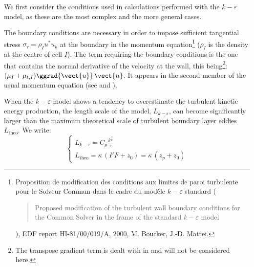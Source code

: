 We first consider the conditions used in calculations performed with the
$k-\varepsilon$ model, as these are the most complex and the more general cases.

The boundary conditions are necessary in order to impose sufficient tangential
stress $\sigma_\tau=\rho_Iu^*u_k$ at the boundary in the momentum
equation\footnote{Proposition de modification des conditions aux limites de
paroi turbulente pour le Solveur Commun dans le cadre du mod\`ele
$k-\varepsilon$ standard ({\it \begin{quotation}
Proposed modification of the turbulent wall boundary conditions for the
Common Solver in the frame of the standard $k-\varepsilon$ model
\end{quotation} }), EDF report HI-81/00/019/A, 2000, M. Boucker, J.-D. Mattei.}
($\rho_I$ is the density at the centre of cell $I$). The term requiring the boundary
conditions is the one that contains the normal derivative of the velocity at the wall,
this being\footnote{The transpose gradient term is dealt with in 
and will not be considered here.}: $(\mu_I+\mu_{t,I})\ggrad{\vect{u}}\,\vect{n}$.
It appears in the second member of the usual
momentum equation (see  and ).

When the $k-\varepsilon$ model shows a tendency to overestimate the turbulent kinetic
energy production, the length scale of the model, $L_{k-\varepsilon}$, can become
significantly larger than the maximum theoretical scale of turbulent boundary layer
eddies $L_{\text{theo}}$. We write:
\begin{equation}
\left\{\begin{array}{l}
L_{k-\varepsilon} = C_{\mu}\displaystyle\frac{k^\frac{3}{2}}{\varepsilon}\\
L_{\text{theo}} = \kappa\, \left( I'F+z_0 \right) = \kappa\, \left(z_p+z_0 \right)
\end{array}\right.
\end{equation}

